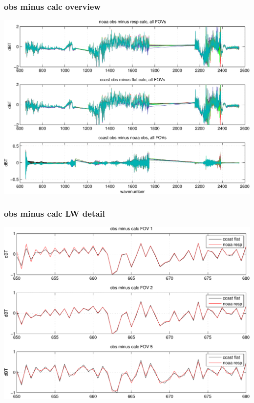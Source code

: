 \documentclass[11pt]{beamer}
\begin{document}
\begin{frame}
\frametitle{obs minus calc overview}
\begin{center}
  \includegraphics[scale=0.5]{figures/cal_summary.pdf}
\end{center}
\end{frame}
\begin{frame}
\frametitle{obs minus calc LW detail}
\begin{center}
  \includegraphics[scale=0.5]{figures/cal_LW_detail.pdf}
\end{center}
\end{frame}
\end{document}
